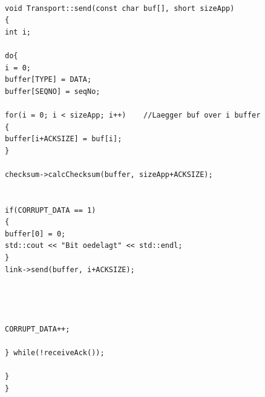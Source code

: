 \begin{lstlisting}[frame=single]  % Start your code-block

void Transport::send(const char buf[], short sizeApp)
{
int i;

do{
i = 0;
buffer[TYPE] = DATA;
buffer[SEQNO] = seqNo;

for(i = 0; i < sizeApp; i++)    //Laegger buf over i buffer
{
buffer[i+ACKSIZE] = buf[i];
}

checksum->calcChecksum(buffer, sizeApp+ACKSIZE);


if(CORRUPT_DATA == 1)
{
buffer[0] = 0;
std::cout << "Bit oedelagt" << std::endl;
}
link->send(buffer, i+ACKSIZE);




CORRUPT_DATA++;

} while(!receiveAck());

}
}
\end{lstlisting}

